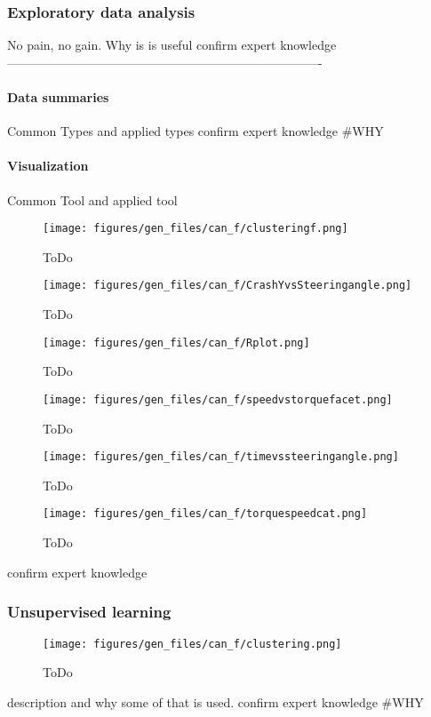 	\subsubsection{Exploratory data analysis}
		No pain, no gain. Why is is useful
		confirm expert knowledge
%
----------------------------------------------------------------------------
		\paragraph{Data summaries}
		Common Types and applied types
		confirm expert knowledge
		#WHY
		\paragraph{Visualization}
		Common Tool and applied tool
		\begin{figure}[!ht]
			\centering
			\texttt{[image: figures/gen\_files/can\_f/clusteringf.png]}
			\caption{ToDo} 
			\end{figure}
		\begin{figure}[!ht]
			\centering
			\texttt{[image: figures/gen\_files/can\_f/CrashYvsSteeringangle.png]}
			\caption{ToDo} 
			\end{figure}
		\begin{figure}[!ht]
			\centering
			\texttt{[image: figures/gen\_files/can\_f/Rplot.png]}
			\caption{ToDo} 
			\end{figure}		
		\begin{figure}[!ht]
			\centering
			\texttt{[image: figures/gen\_files/can\_f/speedvstorquefacet.png]}
			\caption{ToDo} 
			\end{figure}	
		\begin{figure}[!ht]
			\centering
			\texttt{[image: figures/gen\_files/can\_f/timevssteeringangle.png]}
			\caption{ToDo} 
			\end{figure}	
		\begin{figure}[!ht]
			\centering
			\texttt{[image: figures/gen\_files/can\_f/torquespeedcat.png]}
			\caption{ToDo} 
			\end{figure}		
		confirm expert knowledge
	\subsubsection{Unsupervised learning}
			\begin{figure}[!ht]
			\centering
			\texttt{[image: figures/gen\_files/can\_f/clustering.png]}
			\caption{ToDo} 
			\end{figure}
	description and why some of that is used.
	confirm expert knowledge
	#WHY
